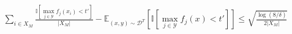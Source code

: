 \documentclass[preview]{standalone}
\begin{document}
\begin{align*}
\sum_{i \in X_M} \frac{\mathbb{I}[\max_{j \in \mathcal{Y}} f_j(x_i) < t']}{|X_M|} - \mathbb{E}_{(x,y) \sim \mathcal{D}^T}\left[\mathbb{I}\left[\max_{j \in \mathcal{Y}} f_j(x) < t'\right]\right] \leq \sqrt{\frac{\log(8/\delta)}{2|X_M|}}
\end{align*}
\end{document}
